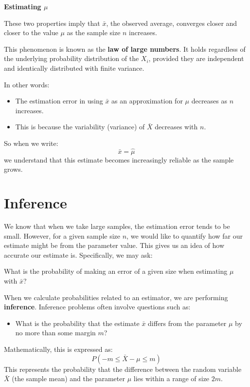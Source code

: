 \documentclass[
]{book}
\providecommand{\tightlist}{%
  \setlength{\itemsep}{0pt}\setlength{\parskip}{0pt}}
\begin{document}
\textbf{Estimating \(\mu\)}

These two properties imply that \(\bar{x}\), the observed average, converges closer and closer to the value \(\mu\) as the sample size \(n\) increases.

This phenomenon is known as the \textbf{law of large numbers}. It holds regardless of the underlying probability distribution of the \(X_i\), provided they are independent and identically distributed with finite variance.

In other words:

\begin{itemize}
\item
  The estimation error in using \(\bar{x}\) as an approximation for \(\mu\) decreases as \(n\) increases.
\item
  This is because the variability (variance) of \(\bar{X}\) decreases with \(n\).
\end{itemize}

So when we write:
\[
\bar{x} = \hat{\mu}
\]
we understand that this estimate becomes increasingly reliable as the sample grows.

\hypertarget{inference}{%
\section{Inference}\label{inference}}

We know that when we take large samples, the estimation error tends to be small. However, for a given sample size \(n\), we would like to quantify how far our estimate might be from the parameter value. This gives us an idea of how accurate our estimate is. Specifically, we may ask:

What is the probability of making an error of a given size when estimating \(\mu\) with \(\bar{x}\)?

When we calculate probabilities related to an estimator, we are performing \textbf{inference}. Inference problems often involve questions such as:

\begin{itemize}
\tightlist
\item
  What is the probability that the estimate \(\bar{x}\) differs from the parameter \(\mu\) by no more than some margin \(m\)?
\end{itemize}

Mathematically, this is expressed as:
\[
P(-m \leq \bar{X} - \mu \leq m)
\]
This represents the probability that the difference between the random variable \(\bar{X}\) (the sample mean) and the parameter \(\mu\) lies within a range of size \(2m\).
\end{document}
